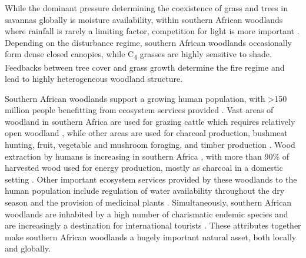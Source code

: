 \begin{refsection}
While the dominant pressure determining the coexistence of grass and trees in savannas globally is moisture availability, within southern African woodlands where rainfall is rarely a limiting factor, competition for light is more important \citep{Vadigi2013}. Depending on the disturbance regime, southern African woodlands occasionally form dense closed canopies, while C\textsubscript{4} grasses are highly sensitive to shade. Feedbacks between tree cover and grass growth determine the fire regime and lead to highly heterogeneous woodland structure.

Southern African woodlands support a growing human population, with >150 million people benefitting from ecosystem services provided \citep{Ryan2016, Wunder2014}. Vast areas of woodland in southern Africa are used for grazing cattle which requires relatively open woodland \citep{Njana2013}, while other areas are used for charcoal production, bushmeat hunting, fruit, vegetable and mushroom foraging, and timber production \citep{Ryan2016}. Wood extraction by humans is increasing in southern Africa \citep{Hansen2013}, with more than 90\% of harvested wood used for energy production, mostly as charcoal in a domestic setting \citep{May-Tobin2011}. Other important ecosystem services provided by these woodlands to the human population include regulation of water availability throughout the dry season \citep{Wilk2010, Hecky2003} and the provision of medicinal plants \citep{Ryan2016, Augustino2011}. Simultaneously, southern African woodlands are inhabited by a high number of charismatic endemic species \citep{Burgess2004} and are increasingly a destination for international tourists \citep{Vergles2015, Shackleton2007}. These attributes together make southern African woodlands a hugely important natural asset, both locally and globally.


\end{refsection}
